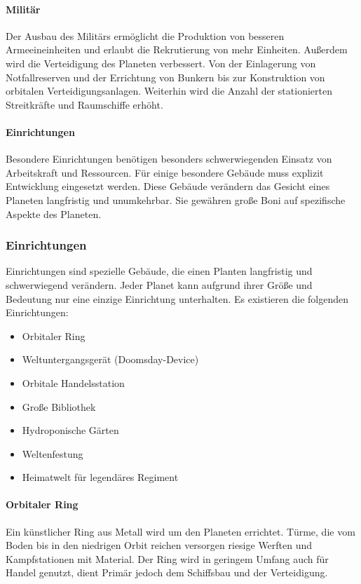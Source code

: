 \documentclass[11pt, a4paper]{article}
\begin{document}
\paragraph{Militär}
Der Ausbau des Militärs ermöglicht die Produktion von besseren Armeeineinheiten und erlaubt die Rekrutierung
von mehr Einheiten. Außerdem wird die Verteidigung des Planeten verbessert. Von der Einlagerung von 
Notfallreserven und der Errichtung von Bunkern bis zur Konstruktion von orbitalen Verteidigungsanlagen.
Weiterhin wird die Anzahl der stationierten Streitkräfte und Raumschiffe erhöht.

\paragraph{Einrichtungen}
Besondere Einrichtungen benötigen besonders schwerwiegenden Einsatz von Arbeitskraft und Ressourcen.
Für einige besondere Gebäude muss explizit Entwicklung eingesetzt werden. Diese Gebäude verändern das Gesicht
eines Planeten langfristig und unumkehrbar. Sie gewähren große Boni auf spezifische Aspekte des Planeten.

\subsubsection{Einrichtungen}
Einrichtungen sind spezielle Gebäude, die einen Planten langfristig und schwerwiegend verändern.
Jeder Planet kann aufgrund ihrer Größe und Bedeutung nur eine einzige Einrichtung unterhalten.
Es existieren die folgenden Einrichtungen:

\begin{itemize}
    \item Orbitaler Ring
    \item Weltuntergangsgerät (Doomsday-Device)
    \item Orbitale Handelsstation
    \item Große Bibliothek
    \item Hydroponische Gärten
    \item Weltenfestung
    \item Heimatwelt für legendäres Regiment
\end{itemize}

\paragraph{Orbitaler Ring}
Ein künstlicher Ring aus Metall wird um den Planeten errichtet. Türme, die vom Boden bis in den niedrigen
Orbit reichen versorgen riesige Werften und Kampfstationen mit Material. Der Ring wird in geringem Umfang auch
für Handel genutzt, dient Primär jedoch dem Schiffsbau und der Verteidigung.
\end{document}
